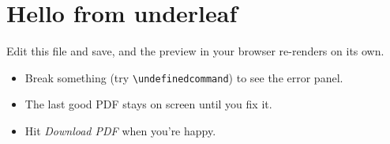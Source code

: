 \documentclass[11pt]{article}
\begin{document}
\section*{Hello from underleaf}

Edit this file and save, and the preview in your browser re-renders on its own.

\begin{itemize}
  \item Break something (try \verb|\undefinedcommand|) to see the error panel.
  \item The last good PDF stays on screen until you fix it.
  \item Hit \emph{Download PDF} when you're happy.
\end{itemize}
\end{document}
